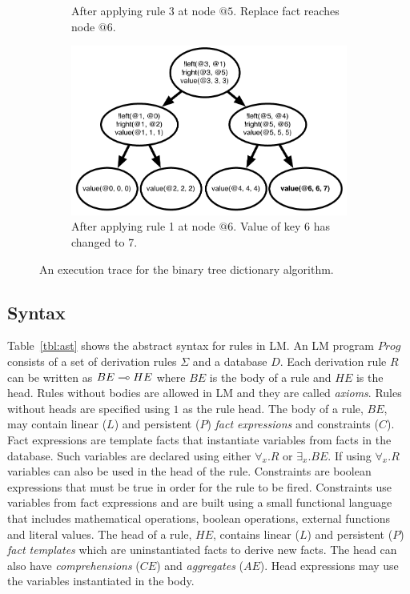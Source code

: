 \begin{figure}[h]
\begin{subfigure}[b]{0.5\textwidth}
                \caption{After applying rule 3 at node $@5$. Replace fact reaches node $@6$.}
                \label{fig:btree_trace3}
        \end{subfigure}%
        \begin{subfigure}[b]{0.5\textwidth}
                  \includegraphics[width=\textwidth]{btree_trace4}
                  \caption{After applying rule 1 at node $@6$. Value of key 6 has changed to 7.}
                  \label{fig:btree_trace4}
          \end{subfigure}
        \caption{An execution trace for the binary tree dictionary algorithm.}\label{fig:btree_trace}
        \vspace{-0.5\intextsep}
\end{figure}

\subsection{Syntax}

Table~\ref{tbl:ast} shows the abstract syntax for rules in LM.
An LM program $Prog$ consists of a set of derivation rules $\Sigma$ and a database $D$.
Each derivation rule $R$ can be written as $BE \multimap HE$ where $BE$ is the body of a rule and
$HE$ is the head. Rules without bodies are allowed in LM and they are called \textit{axioms}.
Rules without heads are specified using $1$ as the rule head.
The body of a rule, $BE$, may contain linear ($L$) and persistent ($P$) \emph{fact expressions}
and constraints ($C$). Fact expressions are template facts that instantiate variables
from facts in the database. Such variables are declared using either $\forall_{x}. R$ or $\exists_{x}. BE$.
If using $\forall_{x}. R$ variables can also be used in the head of the rule.
Constraints are boolean expressions that must
be true in order for the rule to be fired. Constraints use variables from fact expressions and are built using a small functional language that includes mathematical operations, boolean operations, external functions and literal values.
The head of a rule, $HE$, contains linear ($L$) and persistent ($P$) \emph{fact templates} which are uninstantiated facts to derive new facts. The head can also have \emph{comprehensions} ($CE$) and \emph{aggregates} ($AE$). Head
expressions may use the variables instantiated in the body.

